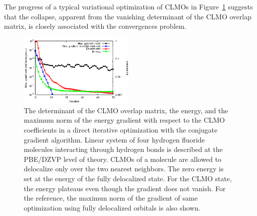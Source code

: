 \documentclass[10pt,amsmath,twocolumn,aps,prl,superscriptaddress,floatfix]{revtex4-1}
\begin{document}
%
The progress of a typical variational optimization of CLMOs in Figure~\ref{fig:det} suggests that the collapse, apparent from the vanishing determinant of the CLMO overlap matrix, is closely associated with the convergences problem.


\begin{figure}
\includegraphics[width=0.5\textwidth]{det}
\caption{
The determinant of the CLMO overlap matrix, the energy, and the maximum norm of the energy gradient with respect to the CLMO coefficients in a direct iterative optimization with the conjugate gradient algorithm. 
Linear system of four hydrogen fluoride molecules interacting through hydrogen bonds is described at the PBE/DZVP level of theory. 
CLMOs of a molecule are allowed to delocalize only over the two nearest neighbors. 
The zero energy is set at the energy of the fully delocalized state. 
For the CLMO state, the energy plateaus even though the gradient does not vanish. 
For the reference, the maximun norm of the gradient of same optimization using fully delocalized orbitals is also shown. %
}
\label{fig:det}
\end{figure}
\end{document}
